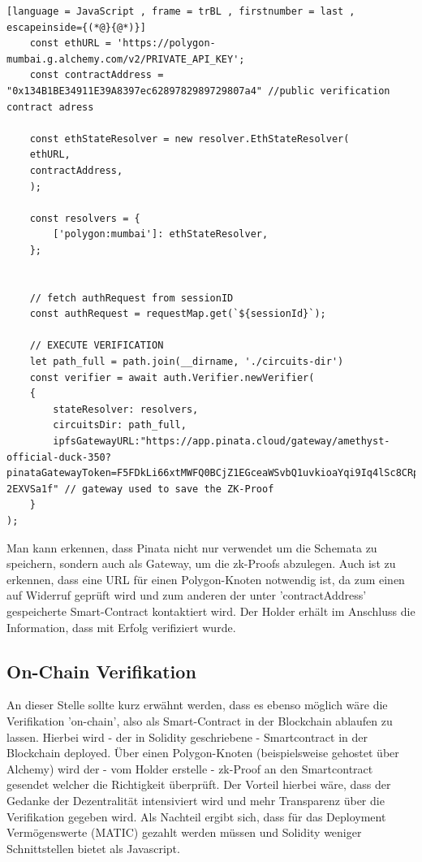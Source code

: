 \begin{lstlisting}[language = JavaScript , frame = trBL , firstnumber = last , escapeinside={(*@}{@*)}]
	const ethURL = 'https://polygon-mumbai.g.alchemy.com/v2/PRIVATE_API_KEY';
	const contractAddress = "0x134B1BE34911E39A8397ec6289782989729807a4" //public verification contract adress
	
	const ethStateResolver = new resolver.EthStateResolver(
	ethURL,
	contractAddress,
	);
	
	const resolvers = {
		['polygon:mumbai']: ethStateResolver,
	};
	
	
	// fetch authRequest from sessionID
	const authRequest = requestMap.get(`${sessionId}`);
	
	// EXECUTE VERIFICATION
	let path_full = path.join(__dirname, './circuits-dir')
	const verifier = await auth.Verifier.newVerifier(
	{
		stateResolver: resolvers,
		circuitsDir: path_full,
		ipfsGatewayURL:"https://app.pinata.cloud/gateway/amethyst-official-duck-350?pinataGatewayToken=F5FDkLi66xtMWFQ0BCjZ1EGceaWSvbQ1uvkioaYqi9Iq4lSc8CRpMi-2EXVSa1f" // gateway used to save the ZK-Proof
	}
);
\end{lstlisting}
Man kann erkennen, dass Pinata nicht nur verwendet um die Schemata zu speichern, sondern auch als Gateway, um die zk-Proofs abzulegen. Auch ist zu erkennen, dass eine URL für einen Polygon-Knoten notwendig ist, da zum einen auf Widerruf geprüft wird und zum anderen der unter 'contractAddress' gespeicherte Smart-Contract kontaktiert wird. Der Holder erhält im Anschluss die Information, dass mit Erfolg verifiziert wurde.

\subsection{On-Chain Verifikation}
An dieser Stelle sollte kurz erwähnt werden, dass es ebenso möglich wäre die Verifikation 'on-chain', also als Smart-Contract in der Blockchain ablaufen zu lassen. Hierbei wird - der in Solidity geschriebene - Smartcontract in der Blockchain deployed. Über einen Polygon-Knoten (beispielsweise gehostet über Alchemy) wird der - vom Holder erstelle - zk-Proof an den Smartcontract gesendet welcher die Richtigkeit überprüft. Der Vorteil hierbei wäre, dass der Gedanke der Dezentralität intensiviert wird und mehr Transparenz über die Verifikation gegeben wird. Als Nachteil ergibt sich, dass für das Deployment Vermögenswerte (MATIC) gezahlt werden müssen und Solidity weniger Schnittstellen bietet als Javascript.

